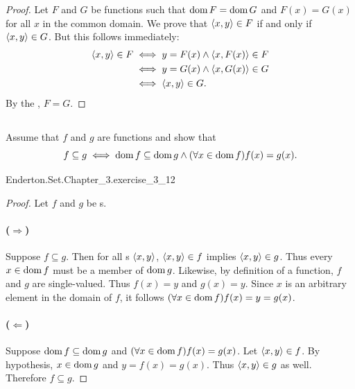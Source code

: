 \documentclass{report}
\begin{document}

  \begin{proof}
    Let $F$ and $G$ be functions such that $\mathop{\text{dom}}{F} = \mathop{\text{dom}}{G}$ and $F(x) = G(x)$
      for all $x$ in the common domain.
    We prove that $\left< x, y \right> \in F$ if and only if $\left< x, y \right> \in G$.
    But this follows immediately:
      \begin{align*}
        \left< x, y \right> \in F
          & \iff y = F(x) \land \left< x, F(x) \right> \in F \\
          & \iff y = G(x) \land \left< x, G(x) \right> \in G \\
          & \iff \left< x, y \right> \in G.
      \end{align*}
    By the , $F = G$.
  \end{proof}

\subsection{}%

  Assume that $f$ and $g$ are functions and show that
    $$f \subseteq g \iff \mathop{\text{dom}}{f} \subseteq \mathop{\text{dom}}{g} \land
      (\forall x \in \mathop{\text{dom}}{f}) f(x) = g(x).$$

    {Enderton.Set.Chapter\_3.exercise\_3\_12}

  \begin{proof}
    Let $f$ and $g$ be s.

    \paragraph{($\Rightarrow$)}%

      Suppose $f \subseteq g$.
      Then for all s $\left< x, y \right>$,
        $\left< x, y \right> \in f$ implies $\left< x, y \right> \in g$.
      Thus every $x \in \mathop{\text{dom}}{f}$ must be a member of $\mathop{\text{dom}}{g}$.
      Likewise, by definition of a function, $f$ and $g$ are single-valued.
      Thus $f(x) = y$ and $g(x) = y$.
      Since $x$ is an arbitrary element in the domain of $f$, it follows
        $(\forall x \in \mathop{\text{dom}}{f}) f(x) = y = g(x)$.

    \paragraph{($\Leftarrow$)}%

      Suppose $\mathop{\text{dom}}{f} \subseteq \mathop{\text{dom}}{g}$ and
        $(\forall x \in \mathop{\text{dom}}{f}) f(x) = g(x)$.
      Let $\left< x, y \right> \in f$.
      By hypothesis, $x \in \mathop{\text{dom}}{g}$ and $y = f(x) = g(x)$.
      Thus $\left< x, y \right> \in g$ as well.
      Therefore $f \subseteq g$.

  \end{proof}
\end{document}
